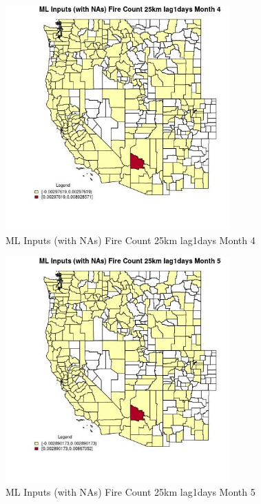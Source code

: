 \begin{figure} 
\centering  
\includegraphics[width=0.77\textwidth]{Code_Outputs/Report_ML_input_PM25_Step4_part_e_de_duplicated_aves_compiled_2019-05-20wNAs_CountyFire_Count_25km_lag1daysmedianMonth4.jpg} 
\caption{\label{fig:Report_ML_input_PM25_Step4_part_e_de_duplicated_aves_compiled_2019-05-20wNAsCountyFire_Count_25km_lag1daysmedianMonth4}ML Inputs (with NAs) Fire Count 25km lag1days Month 4} 
\end{figure} 
 

\begin{figure} 
\centering  
\includegraphics[width=0.77\textwidth]{Code_Outputs/Report_ML_input_PM25_Step4_part_e_de_duplicated_aves_compiled_2019-05-20wNAs_CountyFire_Count_25km_lag1daysmedianMonth5.jpg} 
\caption{\label{fig:Report_ML_input_PM25_Step4_part_e_de_duplicated_aves_compiled_2019-05-20wNAsCountyFire_Count_25km_lag1daysmedianMonth5}ML Inputs (with NAs) Fire Count 25km lag1days Month 5} 
\end{figure} 
 

